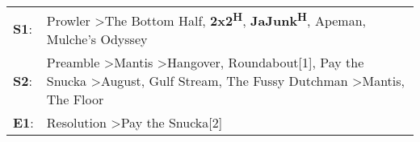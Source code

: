 \begin{supertabular}{p{0.03\textwidth}p{0.92\textwidth}}
 \textbf{S1}:  &                                                                                                                                                                                    Prowler\textsuperscript{} \textgreater \enspace The Bottom Half\textsuperscript{}, \enspace \textbf{2x2\textsuperscript{H}}, \enspace \textbf{JaJunk\textsuperscript{H}}, \enspace Apeman\textsuperscript{}, \enspace Mulche's Odyssey\textsuperscript{}  \enspace  \\
 \textbf{S2}:  &  Preamble\textsuperscript{} \textgreater \enspace Mantis\textsuperscript{} \textgreater \enspace Hangover\textsuperscript{}, \enspace Roundabout[1]\textsuperscript{}, \enspace Pay the Snucka\textsuperscript{} \textgreater \enspace August\textsuperscript{}, \enspace Gulf Stream\textsuperscript{}, \enspace The Fussy Dutchman\textsuperscript{} \textgreater \enspace Mantis\textsuperscript{}, \enspace The Floor\textsuperscript{}  \enspace  \\
 \textbf{E1}:  &                                                                                                                                                                                                                                                                                                                                                      Resolution\textsuperscript{} \textgreater \enspace Pay the Snucka[2]\textsuperscript{}  \enspace  \\
\end{supertabular}

